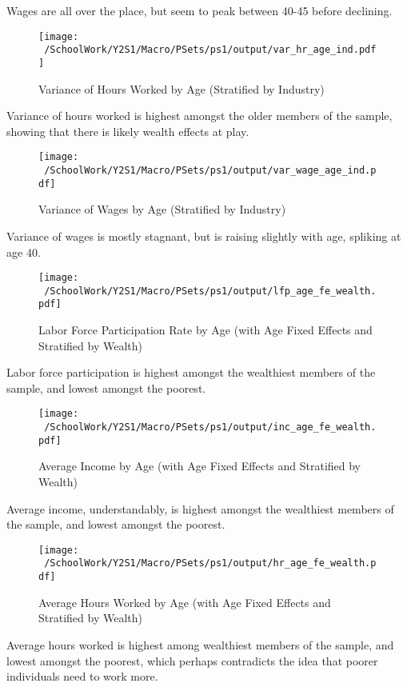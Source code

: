 \documentclass[12pt]{article}
\begin{document}
Wages are all over the place, but seem to peak between 40-45 before declining.

\begin{figure}[h!]
    \centering
    \texttt{[image: ~/SchoolWork/Y2S1/Macro/PSets/ps1/output/var\_hr\_age\_ind.pdf]}
    \caption{Variance of Hours Worked by Age (Stratified by Industry)}
\end{figure}

Variance of hours worked is highest amongst the older members of the sample, showing that there is likely wealth effects at play.

\begin{figure}[h!]
    \centering
    \texttt{[image: ~/SchoolWork/Y2S1/Macro/PSets/ps1/output/var\_wage\_age\_ind.pdf]}
    \caption{Variance of Wages by Age (Stratified by Industry)}
\end{figure}

Variance of wages is mostly stagnant, but is raising slightly with age, spliking at age 40.

\begin{figure}[h!]
    \centering
    \texttt{[image: ~/SchoolWork/Y2S1/Macro/PSets/ps1/output/lfp\_age\_fe\_wealth.pdf]}
    \caption{Labor Force Participation Rate by Age (with Age Fixed Effects and Stratified by Wealth)}
\end{figure}  

Labor force participation is highest amongst the wealthiest members of the sample, and lowest amongst the poorest.

\begin{figure}[h!]
    \centering
    \texttt{[image: ~/SchoolWork/Y2S1/Macro/PSets/ps1/output/inc\_age\_fe\_wealth.pdf]}
    \caption{Average Income by Age (with Age Fixed Effects and Stratified by Wealth)}
\end{figure}
Average income, understandably, is highest amongst the wealthiest members of the sample, and lowest amongst the poorest.

\begin{figure}[h!]
    \centering
    \texttt{[image: ~/SchoolWork/Y2S1/Macro/PSets/ps1/output/hr\_age\_fe\_wealth.pdf]}
    \caption{Average Hours Worked by Age (with Age Fixed Effects and Stratified by Wealth)}
\end{figure}

Average hours worked is highest among wealthiest members of the sample, and lowest amongst the poorest, which perhaps contradicts
the idea that poorer individuals need to work more.
\end{document}
